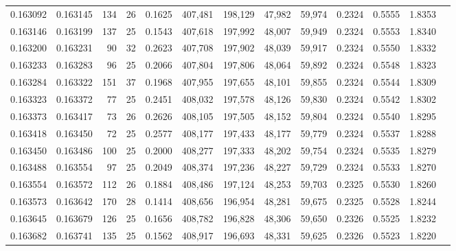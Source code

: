 \begin{tabular}{rrrrrrrrrrrrr}
0.163092 & 0.163145 & 134 &  26 &                                     0.1625 & 407,481 & 198,129 &  47,982 &  59,974 & 0.2324 & 0.5555 & 1.8353 \\
0.163146 & 0.163199 & 137 &  25 &                                     0.1543 & 407,618 & 197,992 &  48,007 &  59,949 & 0.2324 & 0.5553 & 1.8340 \\
0.163200 & 0.163231 &  90 &  32 &                                     0.2623 & 407,708 & 197,902 &  48,039 &  59,917 & 0.2324 & 0.5550 & 1.8332 \\
0.163233 & 0.163283 &  96 &  25 &                                     0.2066 & 407,804 & 197,806 &  48,064 &  59,892 & 0.2324 & 0.5548 & 1.8323 \\
0.163284 & 0.163322 & 151 &  37 &                                     0.1968 & 407,955 & 197,655 &  48,101 &  59,855 & 0.2324 & 0.5544 & 1.8309 \\
0.163323 & 0.163372 &  77 &  25 &                                     0.2451 & 408,032 & 197,578 &  48,126 &  59,830 & 0.2324 & 0.5542 & 1.8302 \\
0.163373 & 0.163417 &  73 &  26 &                                     0.2626 & 408,105 & 197,505 &  48,152 &  59,804 & 0.2324 & 0.5540 & 1.8295 \\
0.163418 & 0.163450 &  72 &  25 &                                     0.2577 & 408,177 & 197,433 &  48,177 &  59,779 & 0.2324 & 0.5537 & 1.8288 \\
0.163450 & 0.163486 & 100 &  25 &                                     0.2000 & 408,277 & 197,333 &  48,202 &  59,754 & 0.2324 & 0.5535 & 1.8279 \\
0.163488 & 0.163554 &  97 &  25 &                                     0.2049 & 408,374 & 197,236 &  48,227 &  59,729 & 0.2324 & 0.5533 & 1.8270 \\
0.163554 & 0.163572 & 112 &  26 &                                     0.1884 & 408,486 & 197,124 &  48,253 &  59,703 & 0.2325 & 0.5530 & 1.8260 \\
0.163573 & 0.163642 & 170 &  28 &                                     0.1414 & 408,656 & 196,954 &  48,281 &  59,675 & 0.2325 & 0.5528 & 1.8244 \\
0.163645 & 0.163679 & 126 &  25 &                                     0.1656 & 408,782 & 196,828 &  48,306 &  59,650 & 0.2326 & 0.5525 & 1.8232 \\
0.163682 & 0.163741 & 135 &  25 &                                     0.1562 & 408,917 & 196,693 &  48,331 &  59,625 & 0.2326 & 0.5523 & 1.8220 \\

\end{tabular}
